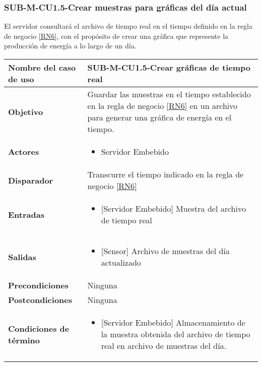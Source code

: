 \subsubsection{SUB-M-CU1.5-Crear muestras para gráficas del día actual}\label{SUB-M-CU1.5}
El servidor consultará el archivo de tiempo real en el tiempo definido en la regla de negocio \ref{RN6}, con el propósito de crear una gráfica que represente la producción de energía a lo largo de un día.
\begin{longtable}{|J{5cm}|J{10.3cm}|}
	\hline
	\textbf{Nombre del caso de uso} &
		SUB-M-CU1.5-Crear gráficas de tiempo real \\ \hline
	\textbf{Objetivo} &
		Guardar las muestras en el tiempo establecido en la regla de negocio \ref{RN6} en un archivo para generar una gráfica de energía en el tiempo. \\ \hline
	\textbf{Actores} &
	    \begin{itemize}
		    \item Servidor Embebido
		\end{itemize}\\ \hline 
	\textbf{Disparador} & 
		Transcurre el tiempo indicado en la regla de negocio \ref{RN6} \\ \hline 
	\textbf{Entradas} & 
		\begin{itemize}
				\item {[Servidor Embebido]} Muestra del archivo de tiempo real
		\end{itemize}\\ \hline 
	\textbf{Salidas} & 
	    \begin{itemize}
	        \item {[Sensor]} Archivo de muestras del día actualizado
	    \end{itemize}\\ \hline
	\textbf{Precondiciones} & 
		Ninguna \\ \hline
	\textbf{Postcondiciones} &
		Ninguna \\ \hline
	\textbf{Condiciones de término} & 
		\begin{itemize}
		    \item {[Servidor Embebido]} Almacenamiento de la muestra obtenida del archivo de tiempo real en archivo de muestras del día.
		\end{itemize} 
		\\ \hline 

\end{longtable}
